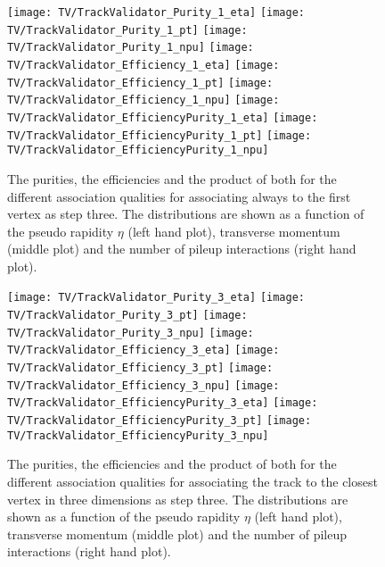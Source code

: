 \begin{figure}[!t]
  \centering
  \texttt{[image: TV/TrackValidator\_Purity\_1\_eta]}
  \texttt{[image: TV/TrackValidator\_Purity\_1\_pt]}
  \texttt{[image: TV/TrackValidator\_Purity\_1\_npu]}
  \newline
  \texttt{[image: TV/TrackValidator\_Efficiency\_1\_eta]}
  \texttt{[image: TV/TrackValidator\_Efficiency\_1\_pt]}
  \texttt{[image: TV/TrackValidator\_Efficiency\_1\_npu]}
  \newline
  \texttt{[image: TV/TrackValidator\_EfficiencyPurity\_1\_eta]}
  \texttt{[image: TV/TrackValidator\_EfficiencyPurity\_1\_pt]}
  \texttt{[image: TV/TrackValidator\_EfficiencyPurity\_1\_npu]}
  \caption[Purities, efficiencies and their product for the different quality of the association map with associating to the first vertex always as third step]{The purities, the efficiencies and the product of both for the different association qualities for associating always to the first vertex as step three. The distributions are shown as a function of the pseudo rapidity $\eta$ (left hand plot), transverse momentum (middle plot) and the number of pileup interactions (right hand plot). \label{plot:TASEFRDQ1Signal}}
\end{figure}

\begin{figure}[h!b]
    \centering
    \texttt{[image: TV/TrackValidator\_Purity\_3\_eta]}
    \texttt{[image: TV/TrackValidator\_Purity\_3\_pt]}
    \texttt{[image: TV/TrackValidator\_Purity\_3\_npu]}
    \newline
    \texttt{[image: TV/TrackValidator\_Efficiency\_3\_eta]}
    \texttt{[image: TV/TrackValidator\_Efficiency\_3\_pt]}
    \texttt{[image: TV/TrackValidator\_Efficiency\_3\_npu]}
    \newline
    \texttt{[image: TV/TrackValidator\_EfficiencyPurity\_3\_eta]}
    \texttt{[image: TV/TrackValidator\_EfficiencyPurity\_3\_pt]}
    \texttt{[image: TV/TrackValidator\_EfficiencyPurity\_3\_npu]}
    \caption[Purities, efficiencies and their product for for the different quality of the association map with associating to the closest vertex in three dimensions as third step]{The purities, the efficiencies and the product of both for the different association qualities for associating the track to the closest vertex in three dimensions as step three. The distributions are shown as a function of the pseudo rapidity $\eta$ (left hand plot), transverse momentum (middle plot) and the number of pileup interactions (right hand plot). \label{plot:TASEFRDQ3Signal}}
\end{figure}


